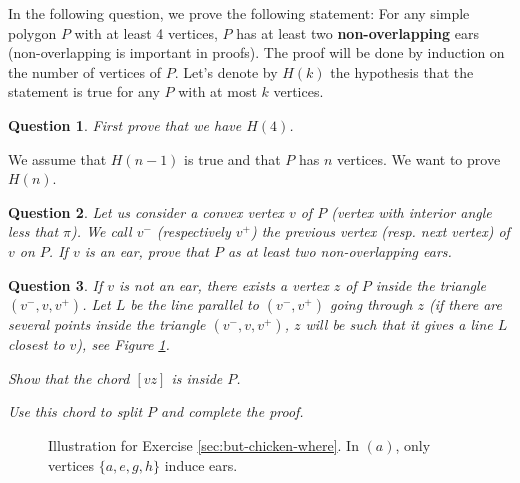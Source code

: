 \documentclass[a4paper, 11pt]{article}
\newtheorem{qu}{Question}
\begin{document}
In the following question, we prove the following statement: For any
simple polygon $P$ with at least 4 vertices, $P$ has at least two
\textbf{non-overlapping} ears (non-overlapping is important in
proofs).  The proof will be done by induction on the number of
vertices of $P$. Let's denote by $H(k)$ the hypothesis that the
statement is true for any $P$ with at most $k$ vertices.

\begin{qu}
  First prove that we have $H(4)$.
\end{qu}

We assume that $H(n-1)$ is true and that $P$ has $n$ vertices. We want
to prove $H(n)$.

\begin{qu}
  Let us consider a convex vertex $v$ of $P$ (vertex with
  interior angle less that $\pi$). We call
  $v^-$ (respectively $v^+$) the previous vertex (resp. next vertex)
  of $v$ on $P$.  If $v$ is an ear, prove that $P$ as at least two
  non-overlapping ears.
\end{qu}


\begin{qu}
  If $v$ is not an ear,  there exists a vertex $z$ of $P$ inside the
  triangle $(v^-,v,v^+)$.  Let $L$ be the line parallel to $(v^-,v^+)$
  going through $z$ (if there are several points inside the triangle
  $(v^-,v,v^+)$, $z$ will be such that it gives a line $L$ closest to
  $v$), see Figure \ref{fig:P}.

  Show that the chord $[vz]$ is inside $P$.

  Use this chord to split $P$ and complete the proof.
\end{qu}

\begin{figure}
  \begin{center}
  \end{center}
  \caption{Illustration for Exercise \ref{sec:but-chicken-where}. In
    $(a)$, only vertices $\{a,e,g,h\}$ induce ears.}
  \label{fig:P}
\end{figure}
\end{document}
